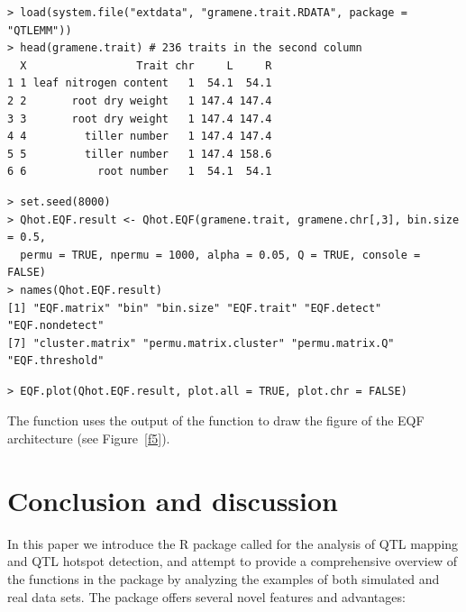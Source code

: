 \begin{verbatim}
> load(system.file("extdata", "gramene.trait.RDATA", package = "QTLEMM"))
> head(gramene.trait) # 236 traits in the second column
  X                 Trait chr     L     R
1 1 leaf nitrogen content   1  54.1  54.1
2 2       root dry weight   1 147.4 147.4
3 3       root dry weight   1 147.4 147.4
4 4         tiller number   1 147.4 147.4
5 5         tiller number   1 147.4 158.6
6 6           root number   1  54.1  54.1
\end{verbatim}

\begin{verbatim}
> set.seed(8000)
> Qhot.EQF.result <- Qhot.EQF(gramene.trait, gramene.chr[,3], bin.size = 0.5, 
  permu = TRUE, npermu = 1000, alpha = 0.05, Q = TRUE, console = FALSE)
> names(Qhot.EQF.result)
[1] "EQF.matrix" "bin" "bin.size" "EQF.trait" "EQF.detect" "EQF.nondetect"
[7] "cluster.matrix" "permu.matrix.cluster" "permu.matrix.Q" "EQF.threshold"
\end{verbatim}

\begin{verbatim}
> EQF.plot(Qhot.EQF.result, plot.all = TRUE, plot.chr = FALSE)
\end{verbatim}

\noindent The  function uses the output of the  function to draw the figure of the EQF architecture (see Figure~\ref{f5}).

\section{Conclusion and discussion}

In this paper we introduce the R package called  for the analysis of QTL mapping and QTL hotspot detection, and attempt to provide a comprehensive overview of the functions in the package by analyzing the examples of both simulated and real data sets. The package offers several novel features and advantages:

